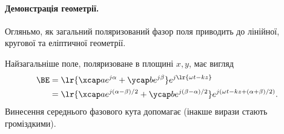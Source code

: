 %
%
\paragraph{Демонстрація геометрії.}
Огляньмо, як загальний поляризований фазор поля приводить до лінійної, кругової та еліптичної геометрії.

Найзагальніше поле, поляризоване в площині \(x, y\), має вигляд
\begin{equation}\label{eqn:polarizationReview:20}
\begin{aligned}
\BE
&= \lr{\xcap a e^{j \alpha} + \ycap b e^{j \beta}} e^{j \lr{\omega t - k z}}
\\ &= \lr{\xcap a e^{j (\alpha - \beta)/2} + \ycap b e^{j (\beta - \alpha)/2}} e^{j (\omega t - k z + (\alpha + \beta)/2)}.
\end{aligned}
\end{equation}
Винесення середнього фазового кута допомагає (інакше вирази стають громіздкими).

